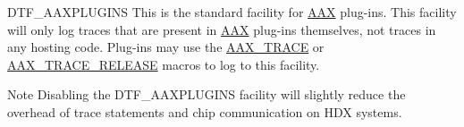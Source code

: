  
\begin{DoxyItemize}
\item {\ttfamily D\+T\+F\+\_\+\+A\+A\+X\+P\+L\+U\+G\+I\+N\+S} This is the standard facility for \hyperlink{a00288}{A\+A\+X} plug-\/ins. This facility will only log traces that are present in \hyperlink{a00288}{A\+A\+X} plug-\/ins themselves, not traces in any hosting code. Plug-\/ins may use the \hyperlink{a00158_ab53f1d6a94f8b6ebb3a101f71bfe4e82}{A\+A\+X\+\_\+\+T\+R\+A\+C\+E} or \hyperlink{a00158_ac2aa820ece56bb59140ad561218db4b3}{A\+A\+X\+\_\+\+T\+R\+A\+C\+E\+\_\+\+R\+E\+L\+E\+A\+S\+E} macros to log to this facility. 

\begin{DoxyNote}{Note}
Disabling the {\ttfamily D\+T\+F\+\_\+\+A\+A\+X\+P\+L\+U\+G\+I\+N\+S} facility will slightly reduce the overhead of trace statements and chip communication on H\+D\+X systems.  
\end{DoxyNote}


\end{DoxyItemize}
